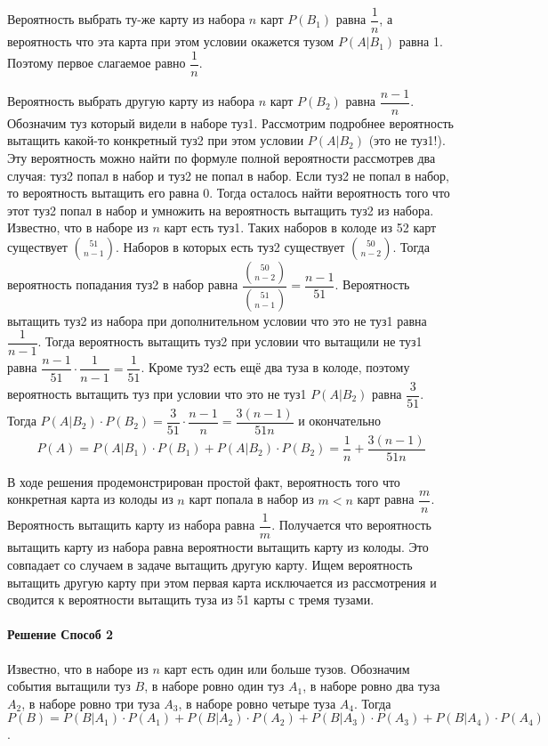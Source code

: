 \documentclass[a4paper,12pt]{article}
\begin{document}
Вероятность выбрать ту-же карту из набора \(n\) карт \(P(B_1)\) равна \( \dfrac{1}{n} \), а вероятность что эта карта при этом условии окажется тузом \(P(A|B_1)\) равна 1. Поэтому первое слагаемое равно \( \dfrac{1}{n} \).

Вероятность выбрать другую карту из набора \(n\) карт \(P(B_2)\) равна \( \dfrac{n-1}{n} \). Обозначим туз который видели в наборе туз1. Рассмотрим подробнее вероятность вытащить какой-то конкретный туз2 при этом условии \(P(A|B_2)\) (это не туз1!). Эту вероятность можно найти по формуле полной вероятности рассмотрев два случая: туз2 попал в набор и туз2 не попал в набор. Если туз2 не попал в набор, то вероятность вытащить его равна 0. Тогда осталось найти вероятность того что этот туз2 попал в набор и умножить на вероятность вытащить туз2 из набора. Известно, что в наборе из \(n\) карт есть туз1. Таких наборов в колоде из 52 карт существует \( \binom{51}{n-1} \). Наборов в которых есть туз2 существует \( \binom{50}{n-2} \). Тогда вероятность попадания туз2 в набор равна \( \dfrac{\binom{50}{n-2}}{\binom{51}{n-1}} = \dfrac{n-1}{51} \). Вероятность вытащить туз2 из набора при дополнительном условии что это не туз1 равна \(\dfrac{1}{n-1}\). Тогда вероятность вытащить туз2 при условии что вытащили не туз1 равна \( \dfrac{n-1}{51} \cdot \dfrac{1}{n-1} = \dfrac{1}{51} \). Кроме туз2 есть ещё два туза в колоде, поэтому вероятность вытащить туз при условии что это не туз1 \(P(A|B_2)\) равна \(\dfrac{3}{51} \). Тогда \( P(A|B_2) \cdot P(B_2) = \dfrac{3}{51} \cdot \dfrac{n-1}{n} = \dfrac{3(n-1)}{51n} \) и окончательно 
\[  P(A) = P(A|B_1) \cdot P(B_1) + P(A|B_2) \cdot P(B_2) = \dfrac{1}{n} + \dfrac{3(n-1)}{51n} \]

В ходе решения продемонстрирован простой факт, вероятность того что конкретная карта из колоды из \(n\) карт попала в набор из \(m < n\) карт равна \( \dfrac{m}{n} \). Вероятность вытащить карту из набора равна \( \dfrac{1}{m} \). Получается что вероятность вытащить карту из набора равна вероятности вытащить карту из колоды. Это совпадает со случаем в задаче вытащить другую карту. Ищем вероятность вытащить другую карту при этом первая карта исключается из рассмотрения и сводится к вероятности вытащить туза из 51 карты с тремя тузами.


\paragraph{Решение Способ 2}
Известно, что в наборе из \(n\) карт есть один или больше тузов. Обозначим события вытащили туз \(B\), в наборе ровно один туз \(A_1\), в наборе ровно два туза \(A_2\), в наборе ровно три туза \(A_3\), в наборе ровно четыре туза \(A_4\). Тогда \( P(B) = P(B|A_1) \cdot P(A_1) + P(B|A_2) \cdot P(A_2) + P(B|A_3) \cdot P(A_3) + P(B|A_4) \cdot P(A_4) \). 
\end{document}
